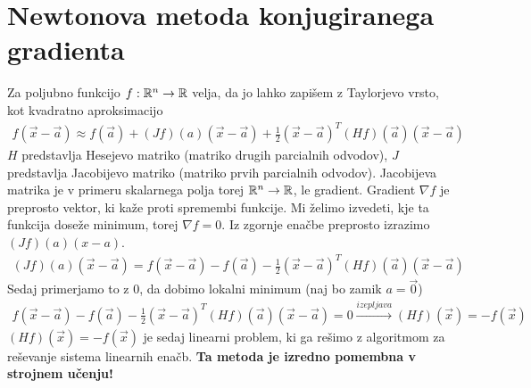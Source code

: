 \section{Newtonova metoda konjugiranega gradienta}
Za poljubno funkcijo $f: \mathbb{R}^n \to \mathbb{R}$ velja, da jo lahko zapišem z Taylorjevo vrsto, kot kvadratno aproksimacijo
\begin{align}
    f(\Vec{x} - \Vec{a}) \approx f(\Vec{a})  + (Jf)(a)(\Vec{x} - \Vec{a}) +  \frac{1}{2} (\Vec{x} - \Vec{a})^T (Hf)(\Vec{a}) (\Vec{x} - \Vec{a})
\end{align}
$H$ predstavlja Hesejevo matriko (matriko drugih parcialnih odvodov), $J$ predstavlja Jacobijevo matriko (matriko prvih parcialnih odvodov). Jacobijeva matrika je v primeru skalarnega polja torej $\mathbb{R}^n \to \mathbb{R}$, le gradient. Gradient $\nabla f$ je preprosto vektor, ki kaže proti spremembi funkcije. Mi želimo izvedeti, kje ta funkcija doseže minimum, torej $\nabla f = 0$. Iz zgornje enačbe preprosto izrazimo $(Jf)(a)(x-a)$.
\begin{align}
    (Jf)(a)(\Vec{x} - \Vec{a}) = f(\Vec{x} - \Vec{a}) - f(\Vec{a}) - \frac{1}{2} (\Vec{x} - \Vec{a})^T (Hf)(\Vec{a}) (\Vec{x} - \Vec{a})
\end{align}
Sedaj primerjamo to z 0, da dobimo lokalni minimum (naj bo zamik $a=\Vec{0}$)
\begin{align}
    f(\Vec{x} - \Vec{a}) - f(\Vec{a}) - \frac{1}{2} (\Vec{x} - \Vec{a})^T (Hf)(\Vec{a}) (\Vec{x} - \Vec{a}) = 0 \xrightarrow{izepljava} (Hf)(\vec{x}) = -f(\vec{x})\  
\end{align}
$(Hf)(\vec{x}) = -f(\vec{x})$ je sedaj linearni problem, ki ga rešimo z algoritmom za reševanje sistema linearnih enačb.
\textbf{Ta metoda je izredno pomembna v strojnem učenju!}

